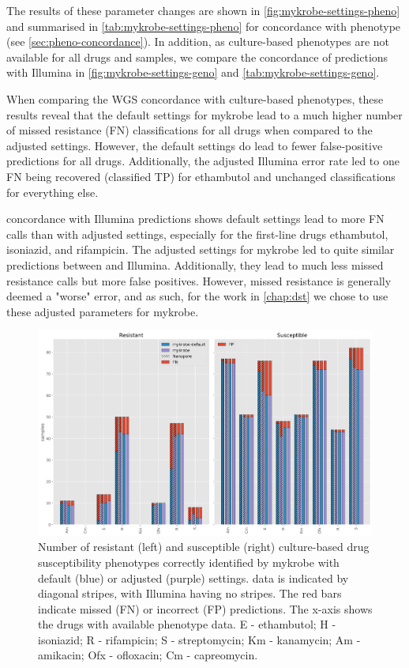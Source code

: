 The results of these parameter changes are shown in \autoref{fig:mykrobe-settings-pheno} and summarised in \autoref{tab:mykrobe-settings-pheno} for concordance with phenotype (see \autoref{sec:pheno-concordance}). In addition, as culture-based phenotypes are not available for all drugs and samples, we compare the concordance of \ont{} predictions with Illumina in \autoref{fig:mykrobe-settings-geno} and \autoref{tab:mykrobe-settings-geno}.

When comparing the WGS concordance with culture-based phenotypes, these results reveal that the default \ont{} settings for mykrobe lead to a much higher number of missed resistance (FN) classifications for all drugs when compared to the adjusted settings. However, the default settings do lead to fewer false-positive predictions for all drugs. Additionally, the adjusted Illumina error rate led to one FN being recovered (classified TP) for ethambutol and unchanged classifications for everything else.

\ont{} concordance with Illumina predictions shows default settings lead to more FN calls than with adjusted settings, especially for the first-line drugs ethambutol, isoniazid, and rifampicin. The adjusted settings for mykrobe led to quite similar predictions between \ont{} and Illumina. Additionally, they lead to much less \ont{} missed resistance calls but more false positives. However, missed resistance is generally deemed a "worse" error, and as such, for the work in \autoref{chap:dst} we chose to use these adjusted parameters for mykrobe.

\begin{figure}
\begin{center}
\includegraphics[width=0.90\columnwidth]{Appendix2/Figs/mykrobe_settings_pheno.png}
\caption{{Number of resistant (left) and susceptible (right) culture-based drug susceptibility phenotypes correctly identified by mykrobe with default (blue) or adjusted (purple) settings. \ont{} data is indicated by diagonal stripes, with Illumina having no stripes. The red bars indicate missed (FN) or incorrect (FP) predictions. The x-axis shows the drugs with available phenotype data. E - ethambutol; H - isoniazid; R - rifampicin; S - streptomycin; Km - kanamycin; Am - amikacin; Ofx - ofloxacin; Cm - capreomycin.
{\label{fig:mykrobe-settings-pheno}}
}}
\end{center}
\end{figure}

